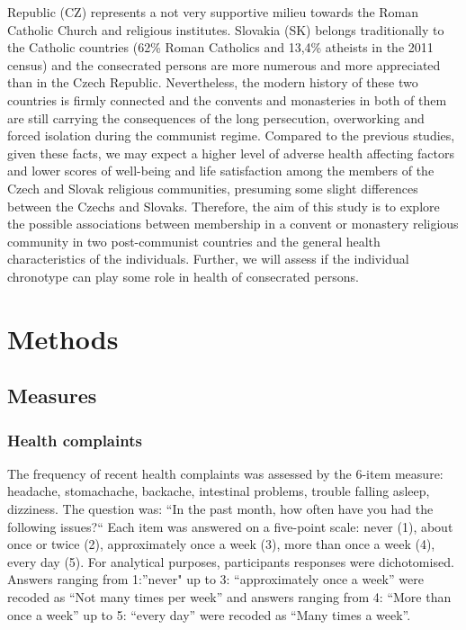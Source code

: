 \documentclass[ijerph,article,accept,moreauthors,pdftex]{mdpi}
\begin{document}
Republic (CZ) represents a not very supportive milieu towards the Roman
Catholic Church and religious institutes. Slovakia (SK) belongs
traditionally to the Catholic countries (62\% Roman Catholics and 13,4\%
atheists in the 2011 census) and the consecrated persons are more
numerous and more appreciated than in the Czech Republic. Nevertheless,
the modern history of these two countries is firmly connected and the
convents and monasteries in both of them are still carrying the
consequences of the long persecution, overworking and forced isolation
during the communist regime. Compared to the previous studies, given
these facts, we may expect a higher level of adverse health affecting
factors and lower scores of well-being and life satisfaction among the
members of the Czech and Slovak religious communities, presuming some
slight differences between the Czechs and Slovaks. Therefore, the aim of
this study is to explore the possible associations between membership in
a convent or monastery religious community in two post-communist
countries and the general health characteristics of the individuals.
Further, we will assess if the individual chronotype can play some role
in health of consecrated persons.

\hypertarget{methods}{%
\section{Methods}\label{methods}}

\hypertarget{measures}{%
\subsection{Measures}\label{measures}}

\hypertarget{health-complaints}{%
\subsubsection{Health complaints}\label{health-complaints}}

The frequency of recent health complaints was assessed by the 6-item
measure: headache, stomachache, backache, intestinal problems, trouble
falling asleep, dizziness. The question was: ``In the past month, how
often have you had the following issues?{}`` Each item was answered on a
five-point scale: never (1), about once or twice (2), approximately once
a week (3), more than once a week (4), every day (5). For analytical
purposes, participants responses were dichotomised. Answers ranging from
1:''never" up to 3: ``approximately once a week'' were recoded as ``Not
many times per week'' and answers ranging from 4: ``More than once a
week'' up to 5: ``every day'' were recoded as ``Many times a week''.
\end{document}
